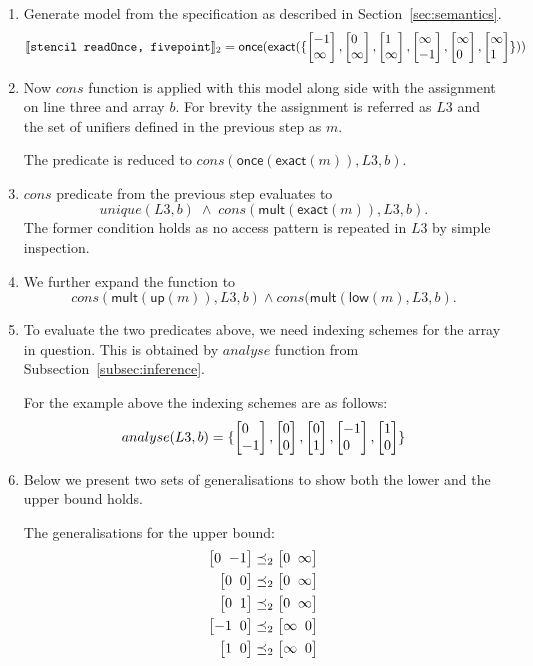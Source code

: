 \documentclass[9pt]{sigplanconf}
\theoremstyle{definition}
\newcommand{\interp}[1]{\llbracket{#1}\rrbracket}
\newcommand{\vtwoh}[2]{\setlength{\arraycolsep}{0em}
\left[\begin{array}{cc}#1 \; & \; #2\end{array}\right]}
\newcommand{\vtwo}[2]{\setlength{\arraycolsep}{0em}
\left[\begin{array}{l}#1\\#2\end{array}\right]}
\begin{document}
\begin{enumerate}
\item Generate model from the specification as described in
  Section~\ref{sec:semantics}.
%
\begin{dmath*}
\interp{\texttt{stencil readOnce, fivepoint}}_2 =
  \textsf{once}(
    \textsf{exact}(
      \{ \vtwo{-1}{\infty},
          \vtwo{0}{\infty},
          \vtwo{1}{\infty},
          \vtwo{\infty}{-1},
          \vtwo{\infty}{0},
          \vtwo{\infty}{1}\}))
\end{dmath*}
%
\item Now $cons$ function is applied with this model along side with the
  assignment on line three and array $b$. For brevity the assignment is
  referred as $L3$ and the set of unifiers defined in the previous step as
  $m$.

  The predicate is reduced to
  $cons(\textsf{once}(\textsf{exact}(m)),L3,b)$.
%
\item $cons$ predicate from the previous step evaluates to
  $$unique(L3,b) \; \wedge \; cons(\textsf{mult}(\textsf{exact}(m)),L3,b).$$
%
  The former condition holds as no access pattern is repeated in $L3$ by simple
  inspection.
%
\item We further expand the function to 
  \begin{equation*}
    cons(\textsf{mult}(\textsf{up}(m)),L3,b) \wedge 
    cons(\textsf{mult}(\textsf{low}(m),L3,b).
  \end{equation*}
%
\item To evaluate the two predicates above, we need indexing schemes for the
  array in question. This is obtained by $analyse$ function from
  Subsection~\ref{subsec:inference}.

  For the example above the indexing schemes are as follows:
%
\begin{dmath*}
analyse(L3,b) =
  \{ \vtwo{0}{-1},
     \vtwo{0}{0},
     \vtwo{0}{1},
     \vtwo{-1}{0},
     \vtwo{1}{0}
  \}
\end{dmath*}
%
\item Below we present two sets of generalisations to show both the lower and
  the upper bound holds.

  The generalisations for the upper bound:
  \begin{align*}
     \vtwoh{0}{-1} & \preceq_2 \vtwoh{0}{\infty} \\
     \vtwoh{0}{0} & \preceq_2 \vtwoh{0}{\infty} \\
     \vtwoh{0}{1} & \preceq_2 \vtwoh{0}{\infty} \\
     \vtwoh{-1}{0} & \preceq_2 \vtwoh{\infty}{0} \\
     \vtwoh{1}{0} & \preceq_2 \vtwoh{\infty}{0}
  \end{align*}


\end{enumerate}
\end{document}
